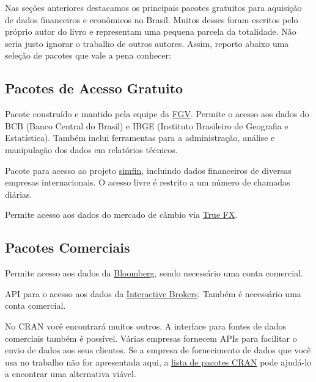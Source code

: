 \documentclass[
  11pt,
]{book}
\providecommand{\tightlist}{%
  \setlength{\itemsep}{0pt}\setlength{\parskip}{0pt}}
\begin{document}
Nas seções anteriores destacamos os principais pacotes gratuitos para aquisição de dados financeiros e econômicos no Brasil. Muitos desses foram escritos pelo próprio autor do livro e representam uma pequena parcela da totalidade. Não seria justo ignorar o trabalho de outros autores. Assim, reporto abaixo uma seleção de pacotes que vale a pena conhecer:

\hypertarget{pacotes-de-acesso-gratuito}{%
\subsection{Pacotes de Acesso Gratuito}\label{pacotes-de-acesso-gratuito}}

\begin{description}
\tightlist
\item[\texttt{BETS} \citep{R-BETS}]
Pacote construído e mantido pela equipe da \href{http://portal.fgv.br/en}{FGV}. Permite o acesso aos dados do BCB (Banco Central do Brasil) e IBGE (Instituto Brasileiro de Geografia e Estatística). Também inclui ferramentas para a administração, análise e manipulação dos dados em relatórios técnicos.
\item[\texttt{simfinR} \citep{R-simfinR}]
Pacote para acesso ao projeto \href{https://simfin.com/}{simfin}, incluindo dados financeiros de diversas empresas internacionais. O acesso livre é restrito a um número de chamadas diárias.
\item[\texttt{TFX} \citep{R-TFX}]
Permite acesso aos dados do mercado de câmbio via \href{https://www.truefx.com/}{True FX}.
\end{description}

\hypertarget{pacotes-comerciais}{%
\subsection{Pacotes Comerciais}\label{pacotes-comerciais}}

\begin{description}
\tightlist
\item[\texttt{Rblpapi} \citep{R-Rblpapi}]
Permite acesso aos dados da \href{https://www.bloomberg.com/}{Bloomberg}, sendo necessário uma conta comercial.
\item[\texttt{IBrokers} \citep{R-IBrokers}]
API para o acesso aos dados da \href{https://www.interactivebrokers.com/en/home.php}{Interactive Brokers}. Também é necessário uma conta comercial.
\end{description}

No CRAN você encontrará muitos outros. A interface para fontes de dados comerciais também é possível. Várias empresas fornecem APIs para facilitar o envio de dados aos seus clientes. Se a empresa de fornecimento de dados que você usa no trabalho não for apresentada aqui, a \href{https://cran.r-project.org/}{lista de pacotes CRAN} pode ajudá-lo a encontrar uma alternativa viável.
\end{document}

